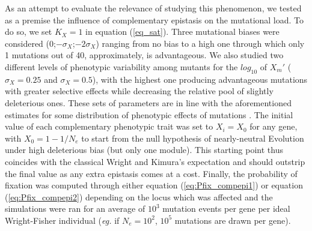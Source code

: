 As an attempt to evaluate the relevance of studying this phenomenon, we tested as a premise the influence of complementary epistasis on the mutational load. To do so, we set $K_X=1$ in equation (\ref{eq_sat}). Three mutational biases were considered ($0$;$-\sigma_X$;$-2\sigma_X$) ranging from no bias to a high one through which only 1 mutations out of 40, approximately, is advantageous. We also studied two different levels of phenotypic variability among mutants for the $log_{10}$ of $X_m'$ ($\sigma_X=0.25$ and $\sigma_X=0.5$), with the highest one producing advantageous mutations with greater selective effects while decreasing the relative pool of slightly deleterious ones. These sets of parameters are in line with the aforementioned estimates for some distribution of phenotypic effects of mutations \citep{Carlin16,Metzger16}. The initial value of each complementary phenotypic trait was set to $X_i=X_0$ for any gene, with $X_0=1-1/N_e$ to start from the null hypothesis of nearly-neutral Evolution under high deleterious bias (but only one module). This starting point thus coincides with the classical Wright and Kimura's expectation and should outstrip the final value as any extra epistasis comes at a cost. Finally, the probability of fixation was computed through either equation (\ref{eq:Pfix_compepi1}) or equation (\ref{eq:Pfix_compepi2}) depending on the locus which was affected and the simulations were ran for an average of $10
^3$ mutation events per gene per ideal Wright-Fisher individual (\textit{eg.} if $N_e=10^2$, $10^5$ mutations are drawn per gene).

